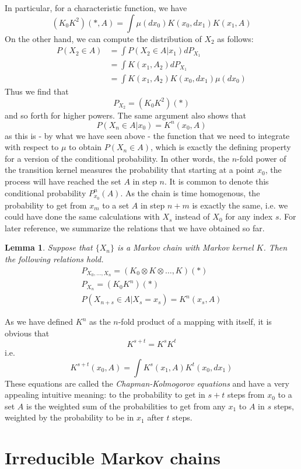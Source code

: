 \documentclass[a4paper, draft]{article}
\theoremstyle{own}
\newtheorem{lem}[thm]{Lemma}
\theoremstyle{remark}
\begin{document}
In particular, for a characteristic function, we have
$$
(K_0 K^2)(*, A) = \int \mu(dx_0) K(x_0, dx_1) K(x_1, A) 
$$
On the other hand, we can compute the distribution of $X_2$ as follows:
\begin{align*}
P(X_2 \in A) &= \int P(X_2 \in A | x_1) dP_{X_1} \\
&= \int K(x_1, A_2) dP_{X_1} \\
&= \int K(x_1, A_2) K(x_0, dx_1) \mu(dx_0) 
\end{align*}
Thus we find that
$$
P_{X_2} = (K_0 K^2)(*)
$$
and so forth for higher powers. The same argument also shows that 
$$
P(X_n \in A | x_0 ) = K^n(x_0, A)
$$
as this is - by what we have seen above - the function that we need to integrate with respect to $\mu$ to obtain $P(X_n \in A)$, which is exactly the defining property for a version of the conditional probability. In other words, the $n$-fold power of the transition kernel measures the probability that starting at a point $x_0$, the process will have reached the set $A$ in step $n$. It is common to denote this conditional probability $P^n_{x_0}(A)$. As the chain is time homogenous, the probability to get from $x_m$ to a set $A$ in step $n+m$ is exactly the same, i.e. we could have done the same calculations with $X_s$ instead of $X_0$ for any index $s$.  For later reference, we summarize the relations that we have obtained so far.

\begin{lem}
	Suppose that $\{X_n\}$ is a Markov chain with Markov kernel $K$. Then the following relations hold.
	\begin{align}\label{lem:markovkernelproducts}
	P_{X_0, \dots, X_n} = (K_0 \otimes K \otimes \dots, K)(*) \\
	P_{X_n} = (K_0 K^n)(*) \\
	P(X_{n+s} \in A | X_s = x_s) = K^n(x_s, A) 
	\end{align}
\end{lem}
As we have defined $K^n$ as the $n$-fold product of a mapping with itself, it is obvious that
$$
K^{s+t} = K^s K^t
$$
i.e.
$$
K^{s+t}(x_0, A) = \int K^s(x_1, A) K^t(x_0, dx_1)
$$
These equations are called the {\em Chapman-Kolmogorov equations} and have a very appealing intuitive meaning: to the probability to get in $s+t$ steps from $x_0$ to a set $A$ is the weighted sum of the probabilities to get from any $x_1$ to $A$ in $s$ steps, weighted by the probability to be in $x_1$ after $t$ steps. 


\section{Irreducible Markov chains}\label{sec:irreduciblemarkovchains}
\end{document}
